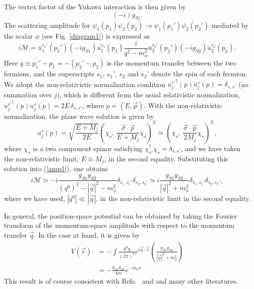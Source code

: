 \documentclass[12pt, a4paper]{article}
\begin{document}
The vertex factor of the Yukawa interaction is then given by
\begin{equation}
(-i )g_{Sj}.\label{v1}
\end{equation}
%
The scattering amplitude for $\psi_1(p_1)\psi_2(p_2)\to\psi_1(p_1')\psi_2(p_2')$ mediated 
by the scalar $\phi$ (see Fig. \ref{diagram1}) is expressed as
%
\begin{equation}
i\mathcal{M}=\bar{u}_1^{s_1'}(p_1')(-ig_{S1})u_1^{s_1}(p_1)\frac{i}{q^2-m_\phi^2}\bar{u}_2^{s_2'}(p_2')(-ig_{S2})u_2^{s_2}(p_2).\label{amp1}
\end{equation}
%
Here $q\equiv p_1'-p_1=-(p_2'-p_2)$ is the momentum transfer between 
the two fermions, and the superscripts $s_1$, $s_1'$, $s_2$ and $s_2'$ 
denote the spin of each fermion.  We adopt  the non-relativistic normalization 
condition ${u_j^{s'}}^\dag(p)u_j^s(p)=\delta_{s,s'}$ (no summation over $j$), which is different from
the usual relativistic normalization, ${u_j^{s'}}^\dag(p)u_j^s(p)= 2 E \,\delta_{s,s'}$, where $p = (E, \vec{p})$.
With the non-relativistic normalization, the plane wave solution is given by
%
\begin{equation}
u_j^s(p)=\sqrt{\frac{E+M_j}{2E}}\left(\chi_s,\, \frac{\vec{\sigma}\cdot\vec{p}}{E+M_j}\chi_s\right)^\mathrm{T}\simeq\left(\chi_s,\, \frac{\vec{\sigma}\cdot\vec{p}}{2M_j}\chi_s\right)^\mathrm{T},\label{plane}
\end{equation}
%
where $\chi_s$ is a  two component spinor satisfying $\chi^\dag_{s'}\chi_s=\delta_{s,s'}$, and
we have taken the non-relativistic limit, $E \approx M_j$,  in the second equality.
Substituting this solution into (\ref{amp1}), one obtains
%
\begin{equation}
i\mathcal{M} \simeq -i\frac{g_{S1}g_{S2}}{(q^0)^2-|\vec{q}|^2-m_\phi^2}\delta_{s_1,s_1'}\delta_{s_2,s_2'}\simeq i\frac{g_{S1}g_{S2}}{|\vec{q}|^2+m_\phi^2}\delta_{s_1,s_1'}\delta_{s_2,s_2'},
\end{equation}
where we have used, $|q^0| \ll |\vec{q}|$, in the non-relativistic limit in the second equality.

In general, the position-space potential can be obtained 
by taking the Fourier transform of the momentum-space amplitude with respect to 
the momentum transfer $\vec{q}$. In the case at hand, it is given by
\begin{align}
V(\vec{r})&=-\int\frac{d^3q}{(2\pi)^3} e^{i\vec{q}\cdot\vec{r}}
\left(\frac{g_{S1}g_{S2}}{|\vec{q}|^2+m_\phi^2}\right)
\\
&=-\frac{g_{S1}g_{S2}}{4\pi r} e^{-m_{\phi}r}
\label{yukawaV}
\end{align}
This result is of course consistent 
with Refs.~\cite{Moody:1984ba} and \cite{Dobrescu:2006au} and many other literatures. 
\end{document}
